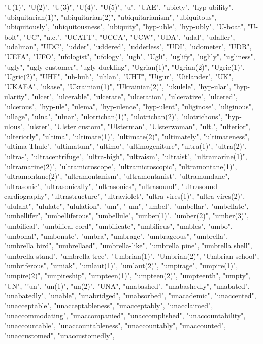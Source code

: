 "U(1)",
"U(2)",
"U(3)",
"U(4)",
"U(5)",
"u",
"UAE",
"ubiety",
"hyp-ubility",
"ubiquitarian(1)",
"ubiquitarian(2)",
"ubiquitarianism",
"ubiquitous",
"ubiquitously",
"ubiquitousness",
"ubiquity",
"hyp-uble",
"hyp-ubly",
"U-boat",
"U-bolt",
"UC",
"u.c.",
"UCATT",
"UCCA",
"UCW",
"UDA",
"udal",
"udaller",
"udalman",
"UDC",
"udder",
"uddered",
"udderless",
"UDI",
"udometer",
"UDR",
"UEFA",
"UFO",
"ufologist",
"ufology",
"ugh",
"Ugli",
"uglify",
"uglily",
"ugliness",
"ugly",
"ugly customer",
"ugly duckling",
"Ugrian(1)",
"Ugrian(2)",
"Ugric(1)",
"Ugric(2)",
"UHF",
"uh-huh",
"uhlan",
"UHT",
"Uigur",
"Uitlander",
"UK",
"UKAEA",
"ukase",
"Ukrainian(1)",
"Ukrainian(2)",
"ukulele",
"hyp-ular",
"hyp-ularity",
"ulcer",
"ulcerable",
"ulcerate",
"ulceration",
"ulcerative",
"ulcered",
"ulcerous",
"hyp-ule",
"ulema",
"hyp-ulence",
"hyp-ulent",
"uliginose",
"uliginous",
"ullage",
"ulna",
"ulnar",
"ulotrichan(1)",
"ulotrichan(2)",
"ulotrichous",
"hyp-ulous",
"ulster",
"Ulster custom",
"Ulsterman",
"Ulsterwoman",
"ult.",
"ulterior",
"ulteriorly",
"ultima",
"ultimate(1)",
"ultimate(2)",
"ultimately",
"ultimateness",
"ultima Thule",
"ultimatum",
"ultimo",
"ultimogeniture",
"ultra(1)",
"ultra(2)",
"ultra-",
"ultracentrifuge",
"ultra-high",
"ultraism",
"ultraist",
"ultramarine(1)",
"ultramarine(2)",
"ultramicroscope",
"ultramicroscopic",
"ultramontane(1)",
"ultramontane(2)",
"ultramontanism",
"ultramontanist",
"ultramundane",
"ultrasonic",
"ultrasonically",
"ultrasonics",
"ultrasound",
"ultrasound cardiography",
"ultrastructure",
"ultraviolet",
"ultra vires(1)",
"ultra vires(2)",
"ululant",
"ululate",
"ululation",
"um",
"-um",
"umbel",
"umbellar",
"umbellate",
"umbellifer",
"umbelliferous",
"umbellule",
"umber(1)",
"umber(2)",
"umber(3)",
"umbilical",
"umbilical cord",
"umbilicate",
"umbilicus",
"umbles",
"umbo",
"umbonal",
"umbonate",
"umbra",
"umbrage",
"umbrageous",
"umbrella",
"umbrella bird",
"umbrellaed",
"umbrella-like",
"umbrella pine",
"umbrella shell",
"umbrella stand",
"umbrella tree",
"Umbrian(1)",
"Umbrian(2)",
"Umbrian school",
"umbriferous",
"umiak",
"umlaut(1)",
"umlaut(2)",
"umpirage",
"umpire(1)",
"umpire(2)",
"umpireship",
"umpteen(1)",
"umpteen(2)",
"umpteenth",
"umpty",
"UN",
"'un",
"un(1)",
"un(2)",
"UNA",
"unabashed",
"unabashedly",
"unabated",
"unabatedly",
"unable",
"unabridged",
"unabsorbed",
"unacademic",
"unaccented",
"unacceptable",
"unacceptableness",
"unacceptably",
"unacclaimed",
"unaccommodating",
"unaccompanied",
"unaccomplished",
"unaccountability",
"unaccountable",
"unaccountableness",
"unaccountably",
"unaccounted",
"unaccustomed",
"unaccustomedly",
